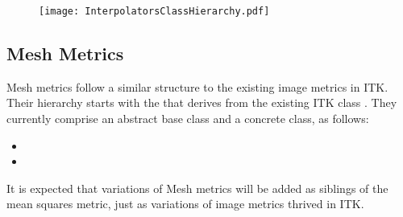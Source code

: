 \documentclass{InsightArticle}
\begin{document}
\begin{figure}
\center
\texttt{[image: InterpolatorsClassHierarchy.pdf]}
\label{fig:ClassHierarchy}
\end{figure}

\subsection{Mesh Metrics}

Mesh metrics follow a similar structure to the existing image metrics in ITK.
Their hierarchy starts with the  that derives from
the existing ITK class . They currently comprise
an abstract base class and a concrete class, as follows:

\begin{itemize}
\item {}
\item {}
\end{itemize}

It is expected that variations of Mesh metrics will be added as siblings of the
mean squares metric, just as variations of image metrics thrived in ITK.
\end{document}
